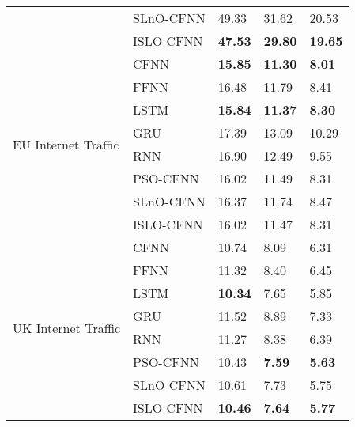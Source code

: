 \documentclass[../main.tex]{subfiles}
\begin{document}
\begin{table}[!t]
\begin{tabular}{|l|l|l|l|l|}
                                     & SLnO-CFNN & 49.33           & 31.62           & 20.53          \\ \cline{2-5} 
                                     & ISLO-CFNN & \textbf{47.53}  & \textbf{29.80}  & \textbf{19.65} \\ \hline
\multirow{8}{*}{EU Internet Traffic} & CFNN      & \textbf{15.85}  & \textbf{11.30}  & \textbf{8.01}  \\ \cline{2-5} 
                                     & FFNN      & 16.48           & 11.79           & 8.41           \\ \cline{2-5} 
                                     & LSTM      & \textbf{15.84}  & \textbf{11.37}  & \textbf{8.30}  \\ \cline{2-5} 
                                     & GRU       & 17.39           & 13.09           & 10.29          \\ \cline{2-5} 
                                     & RNN       & 16.90           & 12.49           & 9.55           \\ \cline{2-5} 
                                     & PSO-CFNN  & 16.02           & 11.49           & 8.31           \\ \cline{2-5} 
                                     & SLnO-CFNN & 16.37           & 11.74           & 8.47           \\ \cline{2-5} 
                                     & ISLO-CFNN & 16.02           & 11.47           & 8.31           \\ \hline
\multirow{8}{*}{UK Internet Traffic} & CFNN      & 10.74           & 8.09            & 6.31           \\ \cline{2-5} 
                                     & FFNN      & 11.32           & 8.40            & 6.45           \\ \cline{2-5} 
                                     & LSTM      & \textbf{10.34}  & 7.65            & 5.85           \\ \cline{2-5} 
                                     & GRU       & 11.52           & 8.89            & 7.33           \\ \cline{2-5} 
                                     & RNN       & 11.27           & 8.38            & 6.39           \\ \cline{2-5} 
                                     & PSO-CFNN  & 10.43           & \textbf{7.59}   & \textbf{5.63}  \\ \cline{2-5} 
                                     & SLnO-CFNN & 10.61           & 7.73            & 5.75           \\ \cline{2-5} 
                                     & ISLO-CFNN & \textbf{10.46}  & \textbf{7.64}   & \textbf{5.77}  \\ \hline
\end{tabular}
\end{table}
\end{document}
